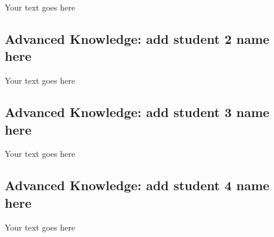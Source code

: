 \documentclass[a4paper, 11pt]{report}
\begin{document}
Your text goes here

\subsection{Advanced Knowledge: add student 2 name here}

Your text goes here

\subsection{Advanced Knowledge: add student 3 name here}

Your text goes here

\subsection{Advanced Knowledge: add student 4 name here}

Your text goes here




\newpage



\end{document}
